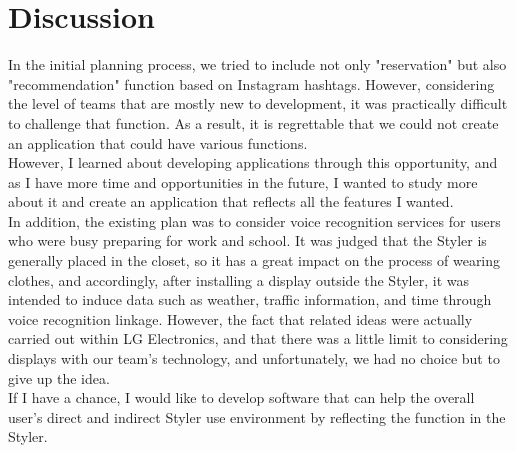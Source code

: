 \documentclass[conference]{IEEEtran}
\begin{document}
\section{Discussion}
In the initial planning process, we tried to include not only "reservation" but also "recommendation" function based on Instagram hashtags. However, considering the level of teams that are mostly new to development, it was practically difficult to challenge that function. As a result, it is regrettable that we could not create an application that could have various functions.\\
However, I learned about developing applications through this opportunity, and as I have more time and opportunities in the future, I wanted to study more about it and create an application that reflects all the features I wanted.\\
In addition, the existing plan was to consider voice recognition services for users who were busy preparing for work and school. It was judged that the Styler is generally placed in the closet, so it has a great impact on the process of wearing clothes, and accordingly, after installing a display outside the Styler, it was intended to induce data such as weather, traffic information, and time through voice recognition linkage. However, the fact that related ideas were actually carried out within LG Electronics, and that there was a little limit to considering displays with our team's technology, and unfortunately, we had no choice but to give up the idea.\\
If I have a chance, I would like to develop software that can help the overall user's direct and indirect Styler use environment by reflecting the function in the Styler.\\
\end{document}

